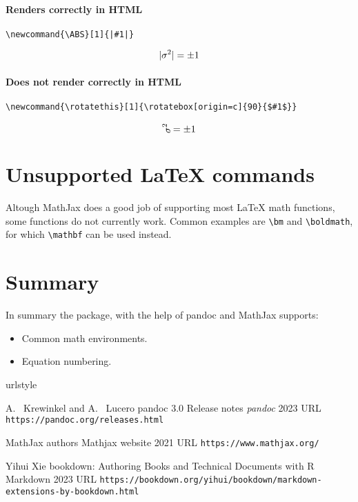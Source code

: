 \paragraph{Renders correctly in HTML}

\begin{verbatim}
\newcommand{\ABS}[1]{|#1|}
\end{verbatim}

$$ \ABS{\sigma^2} = \pm 1 $$

\paragraph{Does not render correctly in HTML}


\begin{verbatim}
\newcommand{\rotatethis}[1]{\rotatebox[origin=c]{90}{$#1$}}
\end{verbatim}

$$ \rotatethis{\sigma^2} = \pm 1 $$


\section{Unsupported LaTeX commands}

Altough MathJax does a good job of supporting most LaTeX math functions,
some functions do not currently work. Common examples are \verb|\bm| and \verb|\boldmath|, for which \verb|\mathbf| can be used instead.





\section{Summary}

In summary the  package, with the help of pandoc and MathJax supports:
\begin{itemize}
\item Common math environments.
\item Equation numbering.
\end{itemize}


\begin{thebibliography}{2}
    \providecommand{\natexlab}[1]{#1}
    \providecommand{\url}[1]{\texttt{#1}}
    \expandafter\ifx\csname urlstyle\endcsname\relax
      \providecommand{\doi}[1]{doi: #1}\else
      \providecommand{\doi}{doi: \begingroup \urlstyle{rm}\Url}\fi

A.~ Krewinkel and A.~ Lucero
\newblock pandoc 3.0 Release notes
\newblock \emph{pandoc}  2023
\newblock URL \url{https://pandoc.org/releases.html}

MathJax authors
\newblock Mathjax website
\newblock  {} 2021
\newblock URL \url{https://www.mathjax.org/}

Yihui Xie
\newblock bookdown: Authoring Books and Technical Documents with R Markdown
\newblock {} 2023
\newblock URL \url{https://bookdown.org/yihui/bookdown/markdown-extensions-by-bookdown.html}

\end{thebibliography}


\address{%
Abhishek Ulayil\\
Student, Institute of Actuaries of India\\%
Mumbai, India\\
ORCiD: 0009-0000-6935-8690\\
}
